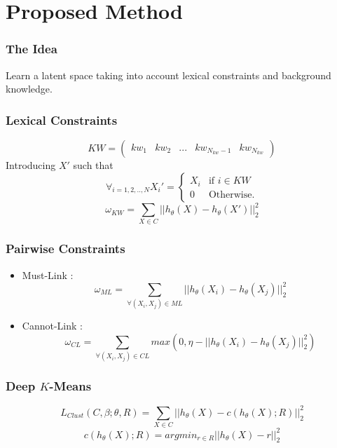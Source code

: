 \documentclass{beamer}
\begin{document}
\section{Proposed Method}

\begin{frame}
\frametitle{The Idea}
Learn a latent space taking into account lexical constraints and
background knowledge.
\end{frame}

\begin{frame}
\frametitle{Lexical Constraints}
\begin{equation*}
KW = \begin{pmatrix} kw_1 & kw_2 & ... & kw_{N_{kw}-1} & kw_{N_{kw}}
\end {pmatrix}
\end{equation*}
\pause
Introducing $X'$ such that
\begin{equation*}
\forall_{i=1,2,..,N}X_i' = \left\{
\begin{array}{ll}
  X_i & \mbox{if } i \in KW \\
  0 & \mbox{Otherwise.}
\end{array}
\right.
\end{equation*}
\pause
\begin{equation*}\label{eq:omega1}
  \omega_{KW} = \sum_{X \in C} || h_{\theta}(X) - h_{\theta}(X')||_2^2
\end{equation*}
\end{frame}

\begin{frame}
\frametitle{Pairwise Constraints}
\pause
\begin{itemize}
\item Must-Link : $$\omega_{ML} = \sum_{\forall{(X_i,X_j)\in ML}} || h_{\theta}(X_i) - h_{\theta}(X_j) ||_2^2$$ \pause
\item Cannot-Link : $$\omega_{CL} = \sum_{\forall{(X_i,X_j)\in CL}} max(0,
  \eta - || h_{\theta}(X_i) - h_{\theta}(X_j) ||_2^2)$$
\end{itemize}
\end{frame}

\begin{frame}
  \frametitle{Deep $K$-Means }
\begin{equation*}
  L_{Clust}(C,\beta;\theta,R) = \sum_{X \in C} ||h_\theta(X)-c(h_\theta(X); R)||_2^2
\end{equation*}
\begin{equation*}
  c(h_\theta(X); R) = argmin_{r \in R}||h_\theta(X) - r||_2^2
\end{equation*}
\end{frame}
\end{document}
